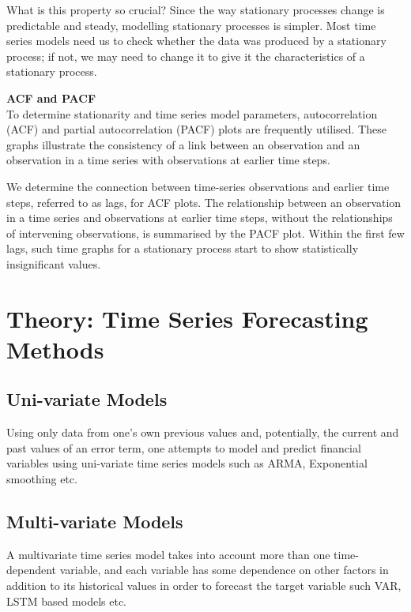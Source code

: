 What is this property so crucial? Since the way stationary processes change is predictable and steady, modelling stationary processes is simpler. Most time series models need us to check whether the data was produced by a stationary process; if not, we may need to change it to give it the characteristics of a stationary process.


\vspace{5mm}
\textbf{ACF and PACF} \\
To determine stationarity and time series model parameters, autocorrelation (ACF) and partial autocorrelation (PACF) plots are frequently utilised. These graphs illustrate the consistency of a link between an observation and an observation in a time series with observations at earlier time steps.

We determine the connection between time-series observations and earlier time steps, referred to as lags, for ACF plots. The relationship between an observation in a time series and observations at earlier time steps, without the relationships of intervening observations, is summarised by the PACF plot. Within the first few lags, such time graphs for a stationary process start to show statistically insignificant values.

\section{Theory: Time Series Forecasting Methods }
\subsection{Uni-variate Models}
\hspace{10mm}Using only data from one's own previous values and, potentially, the current and past values of an error term, one attempts to model and predict financial variables using uni-variate time series models such as ARMA, Exponential smoothing etc.



\subsection{Multi-variate Models}
A multivariate time series model takes into account more than one time-dependent variable, and each variable has some dependence on other factors in addition to its historical values in order to forecast the target variable such VAR, LSTM based models etc.
\vspace{30mm}

